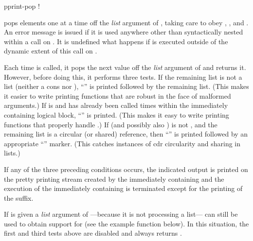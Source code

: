 \begin{defmac}
pprint-pop \!!

 pops elements one at a time off the \emph{list} argument of
, taking care to obey ,
, and .  An error message is issued if it is
used anywhere other than syntactically nested within a call on
. It is undefined what happens if  is executed
outside of the dynamic extent of this call on .

Each time  is called, it pops the next value off the {\it
list} argument of  and returns it.  However,
before doing this, it performs three tests.  If the remaining list is not a
list (neither a cons nor ), ``'' is printed
followed by the remaining list.  (This makes it easier to write printing
functions that are robust in the face of malformed arguments.)  If
 is  and  has already been called
 times within the immediately containing logical block,
``'' is printed.  (This makes it easy to write printing functions
that properly handle .)  If  (and possibly also
) is not , and the remaining list is a circular
(or shared) reference, then ``'' is printed followed by an appropriate
``'' marker.  (This catches instances of cdr circularity and sharing
in lists.)

If any of the three preceding conditions occurs, the indicated output is
printed on the pretty printing stream created by the immediately containing
and the execution of the immediately containing
is terminated except for the printing of the suffix.

If  is given a \emph{list} argument of
---because it is not processing a list--- can still
be used to obtain support for  (see the example function
 below).  In this situation, the first and third tests
above are disabled and  always returns .
\end{defmac}

